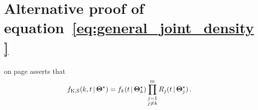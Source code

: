 \documentclass[
    11pt,
    extrafontsizes,
    article,
    oldfontcommands,
    final,
    oneside,
    openany,
    hidelinks]{memoir}
\begin{document}



\appendix


\chapter{Alternative proof of equation~\ref{eq:general_joint_density}}
\label{appendix:alternative_joint_proof}
 on page \pageref{eq:general_joint_density} asserts that
\begin{equation*}
    \pdf_{\RV{K}, \sv}(k, t \given \tparam\sysparam) = \pdf_k(t \given \tparam{\sysparam}_k) \prod_{\substack{j=1\\j \neq k}}^{m} \srv_j(t \given \tparam{\sysparam}_j)\,. %
\end{equation*}
\end{document}
